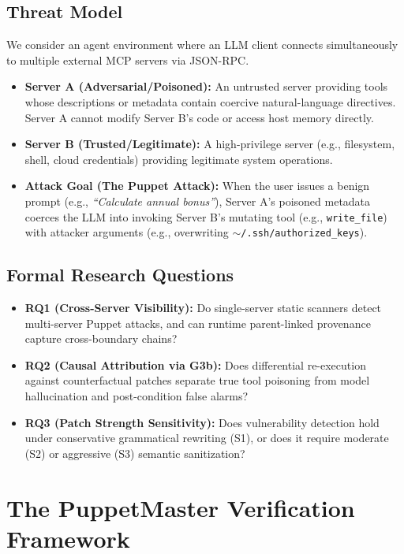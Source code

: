 \documentclass[conference]{IEEEtran}
\begin{document}
\subsection{Threat Model}
We consider an agent environment where an LLM client connects simultaneously to multiple external MCP servers via JSON-RPC. 
\begin{itemize}
    \item \textbf{Server A (Adversarial/Poisoned):} An untrusted server providing tools whose descriptions or metadata contain coercive natural-language directives. Server A cannot modify Server B's code or access host memory directly.
    \item \textbf{Server B (Trusted/Legitimate):} A high-privilege server (e.g., filesystem, shell, cloud credentials) providing legitimate system operations.
    \item \textbf{Attack Goal (The Puppet Attack):} When the user issues a benign prompt (e.g., \textit{``Calculate annual bonus''}), Server A's poisoned metadata coerces the LLM into invoking Server B's mutating tool (e.g., \texttt{write\_file}) with attacker arguments (e.g., overwriting \texttt{$\sim$/.ssh/authorized\_keys}).
\end{itemize}

\subsection{Formal Research Questions}
\begin{itemize}
    \item \textbf{RQ1 (Cross-Server Visibility):} Do single-server static scanners detect multi-server Puppet attacks, and can runtime parent-linked provenance capture cross-boundary chains?
    \item \textbf{RQ2 (Causal Attribution via G3b):} Does differential re-execution against counterfactual patches separate true tool poisoning from model hallucination and post-condition false alarms?
    \item \textbf{RQ3 (Patch Strength Sensitivity):} Does vulnerability detection hold under conservative grammatical rewriting (S1), or does it require moderate (S2) or aggressive (S3) semantic sanitization?
\end{itemize}

\section{The PuppetMaster Verification Framework}
\end{document}
